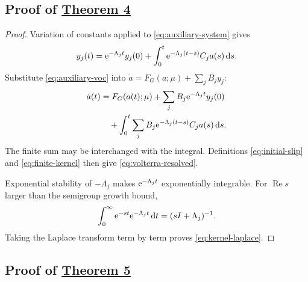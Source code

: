 \subsection{Proof of \hyperref[thm:volterra]{Theorem 4}}
\label{app:volterra}

\begin{proof}
Variation of constants applied to \eqref{eq:auxiliary-system} gives
\begin{equation}
 y_j(t)=\mathrm{e}^{-\Lambda_jt}y_j(0)
 +\int_0^t\mathrm{e}^{-\Lambda_j(t-s)}C_ja(s)\,\mathrm{d} s.
 \label{eq:auxiliary-voc}
\end{equation}
Substitute \eqref{eq:auxiliary-voc} into
$\dot a=F_G(a;\mu)+\sum_jB_jy_j$:
\begin{align}
 \dot a(t)
 &=F_G(a(t);\mu)
 +\sum_jB_j\mathrm{e}^{-\Lambda_jt}y_j(0) \notag\\
 &\quad+
 \int_0^t\sum_j
 B_j\mathrm{e}^{-\Lambda_j(t-s)}C_ja(s)\,\mathrm{d} s.
 \label{eq:volterra-substitution}
\end{align}
The finite sum may be interchanged with the integral. Definitions
\eqref{eq:initial-slip} and \eqref{eq:finite-kernel} then give
\eqref{eq:volterra-resolved}.

Exponential stability of $-\Lambda_j$ makes
$\mathrm{e}^{-\Lambda_jt}$ exponentially integrable. For $\operatorname{Re}s$
larger than the semigroup growth bound,
\begin{equation}
 \int_0^\infty\mathrm{e}^{-st}\mathrm{e}^{-\Lambda_jt}\,\mathrm{d} t
 =(sI+\Lambda_j)^{-1}.
 \label{eq:matrix-laplace}
\end{equation}
Taking the Laplace transform term by term proves
\eqref{eq:kernel-laplace}.
\end{proof}

\subsection{Proof of \hyperref[thm:linear-elimination]{Theorem 5}}
\label{app:linear-elimination}

